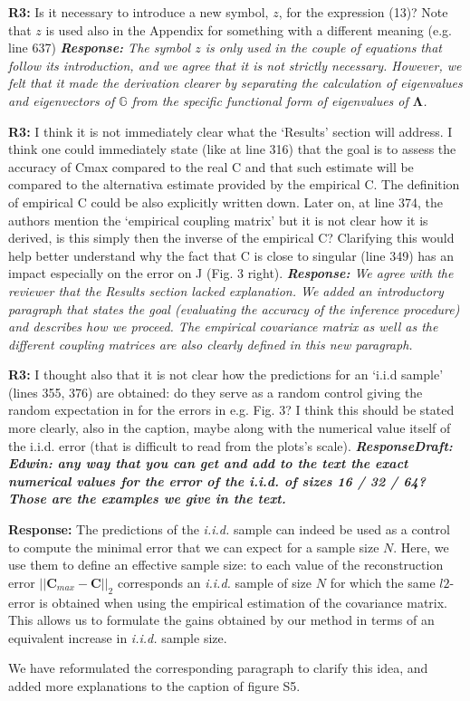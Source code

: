 \documentclass[aps,rmp,onecolumn]{revtex4-1}
\newcommand{\refc}[1]{\textbf{R3:} #1\vskip 5mm}
\newcommand{\response}[1]{{\it {\color{response}\textbf{Response:} #1}}\vskip 5mm}
\newcommand{\responsedraft}[1]{{\it {\color{purple}\textbf{ResponseDraft:} #1}}\vskip 5mm}
\begin{document}
\refc{Is it necessary to introduce a new symbol, $z$, for the expression (13)? 
Note that $z$ is used also in the Appendix for something with a different meaning (e.g. line 637)}
\response{The symbol $z$ is only used in the couple of equations that follow its introduction, and we agree that it is not strictly necessary. 
However, we felt that it made the derivation clearer by separating the calculation of eigenvalues and eigenvectors of $\mathbb{G}$ from the specific functional form of eigenvalues of $\mathbf{\Lambda}$.}


\refc{I think it is not immediately clear what the ‘Results’ section will address. I think one could immediately state (like at line 316) that the goal is to assess the accuracy of Cmax compared to the real C and that such estimate will be compared to the alternativa estimate provided by the empirical C. The definition of empirical C could be also explicitly written down. Later on, at line 374, the authors mention the ‘empirical coupling matrix’ but it is not clear how it is derived, is this simply then the inverse of the empirical C? Clarifying this would help better understand why the fact that C is close to singular (line 349) has an impact especially on the error on J (Fig. 3 right).}
\response{We agree with the reviewer that the Results section lacked explanation. 
We added an introductory paragraph that states the goal (evaluating the accuracy of the inference procedure) and describes how we proceed.
The empirical covariance matrix as well as the different coupling matrices are also clearly defined in this new paragraph. }

\refc{I thought also that it is not clear how the predictions for an ‘i.i.d sample’ (lines 355, 376) are obtained: do they serve as a random control giving the random expectation in for the errors in e.g. Fig. 3? I think this should be stated more clearly, also in the caption, maybe along with the numerical value itself of the i.i.d. error (that is difficult to read from the plots’s scale).}
\responsedraft{{\bf{Edwin}: any way that you can get and add to the text the exact numerical values for the error of the i.i.d. of sizes 16 / 32 / 64? Those are the examples we give in the text.}}
\response{The predictions of the \emph{i.i.d.} sample can indeed be used as a control to compute the minimal error that we can expect for a sample size $N$. 
Here, we use them to define an effective sample size: to each value of the  reconstruction error $\vert\vert \bm{C}_{max} - \bm{C}\vert\vert_2$ corresponds an \emph{i.i.d.} sample of size $N$ for which the same $l2$-error is obtained when using the empirical estimation of the covariance matrix.
This allows us to formulate the gains obtained by our method in terms of an equivalent increase in \emph{i.i.d.} sample size.

We have reformulated the corresponding paragraph to clarify this idea, and added more explanations to the caption of figure S5.}
\end{document}
